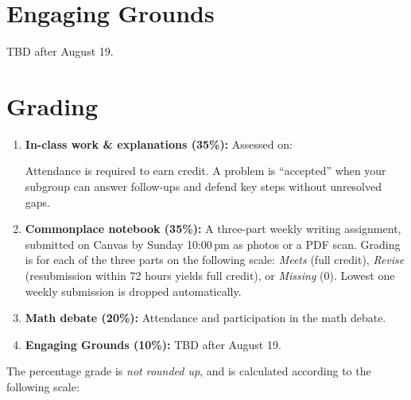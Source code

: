 \documentclass[oneside,11pt]{amsart}
\begin{document}
\section{Engaging Grounds}

TBD after August 19.

\section{Grading}

\begin{enumerate}[$\bullet$]
\item \textbf{In-class work \& explanations (35\%):}
Assessed on:
Attendance is required to earn credit. A problem is ``accepted'' when your subgroup can answer follow-ups and defend key steps without unresolved gaps.

 \item \textbf{Commonplace notebook (35\%):}
	A three-part weekly writing assignment, submitted
	on Canvas by Sunday 10:00\,pm as photos or a PDF scan. 
	Grading is for each of the three parts on the following scale:
	\emph{Meets} (full credit), 
	\emph{Revise} 
	(resubmission within 72 hours yields full credit), or
	\emph{Missing} (0).
	Lowest one weekly submission is dropped
	automatically.

  \item \textbf{Math debate (20\%):}
	Attendance and participation in the math debate.

	\item \textbf{Engaging Grounds (10\%):}
	TBD after August 19.
\end{enumerate}

The percentage grade is \emph{not rounded up}, and is calculated 
according to the following scale:
\begin{center}

\end{center}
\end{document}
